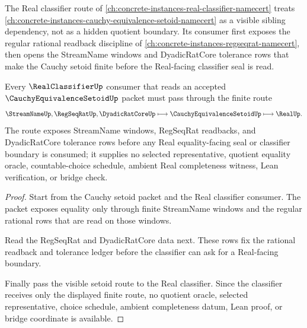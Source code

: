 The Real classifier route of \autoref{ch:concrete-instances-real-classifier-namecert} treats \autoref{ch:concrete-instances-cauchy-equivalence-setoid-namecert} as a visible sibling dependency, not as a hidden quotient boundary. Its consumer first exposes the regular rational readback discipline of \autoref{ch:concrete-instances-regseqrat-namecert}, then opens the StreamName windows and DyadicRatCore tolerance rows that make the Cauchy setoid finite before the Real-facing classifier seal is read.

\begin{theorem}
\label{thm:cauchy-equivalence-setoid-real-classifier-forward-dependency}
Every $\RealClassifierUp$ consumer that reads an accepted $\CauchyEquivalenceSetoidUp$ packet must pass through the finite route
$$
\StreamNameUp,\RegSeqRatUp,\DyadicRatCoreUp\longmapsto\CauchyEquivalenceSetoidUp\longmapsto\RealUp .
$$
The route exposes StreamName windows, RegSeqRat readbacks, and DyadicRatCore tolerance rows before any Real equality-facing seal or classifier boundary is consumed; it supplies no selected representative, quotient equality oracle, countable-choice schedule, ambient Real completeness witness, Lean verification, or bridge check.
\end{theorem}
\begin{proof}
Start from the Cauchy setoid packet and the Real classifier consumer. The packet exposes equality only through finite StreamName windows and the regular rational rows that are read on those windows.

Read the RegSeqRat and DyadicRatCore data next. These rows fix the rational readback and tolerance ledger before the classifier can ask for a Real-facing boundary.

Finally pass the visible setoid route to the Real classifier. Since the classifier receives only the displayed finite route, no quotient oracle, selected representative, choice schedule, ambient completeness datum, Lean proof, or bridge coordinate is available.
\end{proof}
